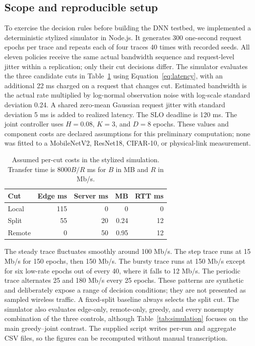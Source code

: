 \documentclass[10pt,a4paper,twocolumn]{article}
\begin{document}
\subsection{Scope and reproducible setup}
To exercise the decision rules before building the DNN testbed, we implemented a deterministic stylized simulator in Node.js. It generates 300 one-second request epochs per trace and repeats each of four traces 40 times with recorded seeds. All eleven policies receive the same actual bandwidth sequence and request-level jitter within a replication; only their cut decisions differ. The simulator evaluates the three candidate cuts in Table~\ref{tab:assumptions} using Equation~\ref{eq:latency}, with an additional 22 ms charged on a request that changes cut. Estimated bandwidth is the actual rate multiplied by log-normal observation noise with log-scale standard deviation 0.24. A shared zero-mean Gaussian request jitter with standard deviation 5 ms is added to realized latency. The SLO deadline is 120 ms. The joint controller uses $H=0.08$, $K=3$, and $D=8$ epochs. These values and component costs are declared assumptions for this preliminary computation; none was fitted to a MobileNetV2, ResNet18, CIFAR-10, or physical-link measurement.

\begin{table}[t]
\centering\small
\caption{Assumed per-cut costs in the stylized simulation. Transfer time is $8000B/R$ ms for $B$ in MB and $R$ in Mb/s.}
\label{tab:assumptions}
\begin{tabular}{@{}lrrrr@{}}\toprule
Cut & Edge ms & Server ms & MB & RTT ms\\\midrule
Local & 115 & 0 & 0 & 0\\
Split & 55 & 20 & 0.24 & 12\\
Remote & 0 & 50 & 0.95 & 12\\\bottomrule
\end{tabular}
\end{table}

The steady trace fluctuates smoothly around 100 Mb/s. The step trace runs at 15 Mb/s for 150 epochs, then 150 Mb/s. The bursty trace runs at 150 Mb/s except for six low-rate epochs out of every 40, where it falls to 12 Mb/s. The periodic trace alternates 25 and 180 Mb/s every 25 epochs. These patterns are synthetic and deliberately expose a range of decision conditions; they are not presented as sampled wireless traffic. A fixed-split baseline always selects the split cut. The simulator also evaluates edge-only, remote-only, greedy, and every nonempty combination of the three controls, although Table~\ref{tab:simulation} focuses on the main greedy--joint contrast. The supplied script writes per-run and aggregate CSV files, so the figures can be recomputed without manual transcription.
\end{document}
